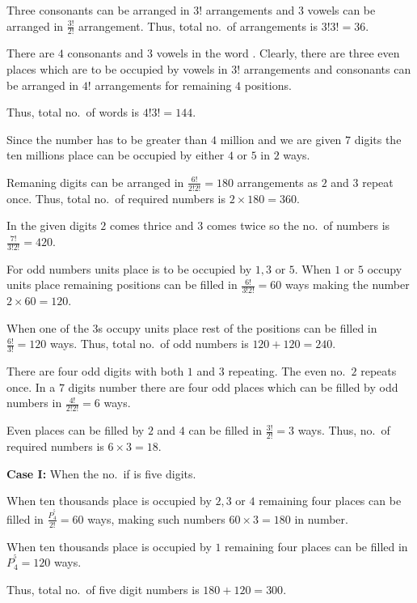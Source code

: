   Three consonants can be arranged in $3!$ arrangements and $3$ vowels can be arranged in $\frac{3!}{2!}$
  arrangement. Thus, total no.\ of arrangements is $3!3! = 36$.
\item There are $4$ consonants and $3$ vowels in the word . Clearly, there are three even
  places which are to be occupied by vowels in $3!$ arrangements and consonants can be arranged in $4!$
  arrangements for remaining $4$ positions.

  Thus, total no.\ of words is $4!3! = 144$.
\item Since the number has to be greater than $4$ million and we are given $7$ digits the ten millions place
  can be occupied by either $4$ or $5$ in $2$ ways.

  Remaning digits can be arranged in $\frac{6!}{2!2!} = 180$ arrangements as $2$ and $3$ repeat once. Thus,
  total no.\ of required numbers is $2\times180 = 360$.
\item In the given digits $2$ comes thrice and $3$ comes twice so the no.\ of numbers is $\frac{7!}{3!2!} =
  420$.

  For odd numbers units place is to be occupied by $1, 3$ or $5$. When $1$ or $5$ occupy units place
  remaining positions can be filled in $\frac{6!}{3!2!} = 60$ ways making the number $2\times60 = 120$.

  When one of the $3$\symbol[rightquote]s occupy units place rest of the positions can be filled in $\frac{6!}{3!} = 120$
  ways. Thus, total no.\ of odd numbers is $120 + 120 = 240$.
\item There are four odd digits with both $1$ and $3$ repeating. The even no.\ $2$ repeats once. In a $7$
  digits number there are four odd places which can be filled by odd numbers in $\frac{4!}{2!2!} = 6$ ways.

  Even places can be filled by $2$ and $4$ can be filled in $\frac{3!}{2!} = 3$ ways. Thus, no.\ of required
  numbers is $6\times3 = 18$.
\item {\bf Case I:} When the no.\ if is five digits.

  When ten thousands place is occupied by $2, 3$ or $4$ remaining four places can be filled in
  $\frac{P_4^^5}{2!} = 60$ ways, making such numbers $60\times3 = 180$ in number.

  When ten thousands place is occupied by $1$ remaining four places can be filled in $P_4^^5 = 120$ ways.

  Thus, total no.\ of five digit numbers is $180 + 120 = 300$.

